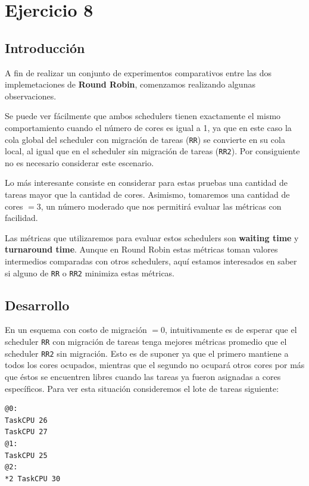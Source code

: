 \section{Ejercicio 8}

\subsection{Introducción}

A fin de realizar un conjunto de experimentos comparativos entre las dos implemetaciones de \textbf{Round Robin}, comenzamos realizando algunas  observaciones.

Se puede ver fácilmente que ambos schedulers tienen exactamente el mismo comportamiento cuando el número de cores es igual a 1, ya que en este caso la cola global del scheduler con migración de tareas (\texttt{RR}) se convierte en su cola local, al igual que en el scheduler sin migración de tareas (\texttt{RR2}). Por consiguiente no es necesario considerar este escenario.

Lo más interesante consiste en considerar para estas pruebas una cantidad de tareas mayor que la cantidad de cores. Asimismo, tomaremos una cantidad de cores $= 3$, un número moderado que nos permitirá evaluar las métricas con facilidad.

Las métricas que utilizaremos para evaluar estos schedulers son \textbf{waiting time} y \textbf{turnaround time}. Aunque en Round Robin estas métricas toman valores intermedios comparadas con otros schedulers, aquí estamos interesados en saber si alguno de \texttt{RR} o \texttt{RR2} minimiza estas métricas.

\subsection{Desarrollo}

En un esquema con costo de migración $= 0$, intuitivamente es de esperar que el scheduler \texttt{RR} con migración de tareas tenga mejores métricas promedio que el scheduler \texttt{RR2} sin migración. Esto es de suponer ya que el primero mantiene a todos los cores ocupados, mientras que el segundo no ocupará otros cores por más que éstos se encuentren libres cuando las tareas ya fueron asignadas a cores específicos. Para ver esta situación consideremos el lote de tareas siguiente:

\begin{minipage}[t]{0.3\textwidth}
\begin{tarea}[H]
\begin{verbatim}
@0:
TaskCPU 26
TaskCPU 27
@1:
TaskCPU 25
@2:
*2 TaskCPU 30
\end{verbatim}
\end{tarea}
\end{minipage}\\\\

